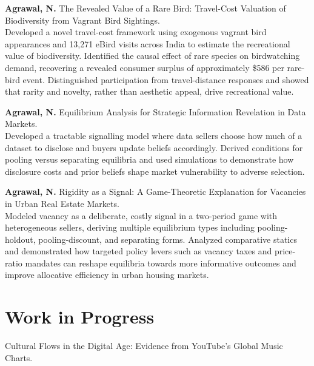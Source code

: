 \documentclass[10pt,a4paper]{article}
\begin{document}
\vspace{5pt}

\textbf{Agrawal, N.} The Revealed Value of a Rare Bird: Travel-Cost Valuation of Biodiversity from Vagrant Bird Sightings.\\
{\small Developed a novel travel-cost framework using exogenous vagrant bird appearances and 13,271 eBird visits across India to estimate the recreational value of biodiversity. Identified the causal effect of rare species on birdwatching demand, recovering a revealed consumer surplus of approximately \$586 per rare-bird event. Distinguished participation from travel-distance responses and showed that rarity and novelty, rather than aesthetic appeal, drive recreational value.}

\vspace{5pt}

\textbf{Agrawal, N.} Equilibrium Analysis for Strategic Information Revelation in Data Markets.\\
{\small Developed a tractable signalling model where data sellers choose how much of a dataset to disclose and buyers update beliefs accordingly. Derived conditions for pooling versus separating equilibria and used simulations to demonstrate how disclosure costs and prior beliefs shape market vulnerability to adverse selection. }

\vspace{5pt}

\textbf{Agrawal, N.} Rigidity as a Signal: A Game-Theoretic Explanation for Vacancies in Urban Real Estate Markets.\\
{\small Modeled vacancy as a deliberate, costly signal in a two-period game with heterogeneous sellers, deriving multiple equilibrium types including pooling-holdout, pooling-discount, and separating forms. Analyzed comparative statics and demonstrated how targeted policy levers such as vacancy taxes and price-ratio mandates can reshape equilibria towards more informative outcomes and improve allocative efficiency in urban housing markets.}


\section{Work in Progress}
Cultural Flows in the Digital Age: Evidence from YouTube's Global Music Charts.
\end{document}
